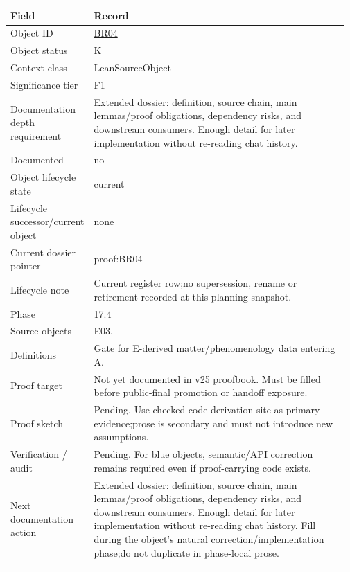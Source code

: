 \begin{longtable}{L{0.16\linewidth} L{0.81\linewidth}}
\hline
\textbf{Field} & \textbf{Record}\\
\hline
Object ID & \hyperlink{object-row-BR04}{BR04}\\
\hline\addlinespace[0.20em]
Object status & K\\
\hline\addlinespace[0.20em]
Context class & LeanSourceObject\\
\hline\addlinespace[0.20em]
Significance tier & F1\\
\hline\addlinespace[0.20em]
Documentation depth requirement & Extended dossier: definition, source chain, main lemmas/\allowbreak{}proof obligations, dependency risks, and downstream consumers. Enough detail for later implementation without re-reading chat history.\\
\hline\addlinespace[0.20em]
Documented & no\\
\hline\addlinespace[0.20em]
Object lifecycle state & current\\
\hline\addlinespace[0.20em]
Lifecycle successor/\allowbreak{}current object & none\\
\hline\addlinespace[0.20em]
Current dossier pointer & proof:BR04\\
\hline\addlinespace[0.20em]
Lifecycle note & Current register row;\newline no supersession, rename or retirement recorded at this planning snapshot.\\
\hline\addlinespace[0.20em]
Phase & \hyperlink{phase-row-17-4}{17.4}\\
\hline\addlinespace[0.20em]
Source objects & E03.\\
\hline\addlinespace[0.20em]
Definitions & Gate for E-derived matter/\allowbreak{}phenomenology data entering A.\\
\hline\addlinespace[0.20em]
Proof target & Not yet documented in v25 proofbook. Must be filled before public-final promotion or handoff exposure.\\
\hline\addlinespace[0.20em]
Proof sketch & Pending. Use checked code derivation site as primary evidence;\newline prose is secondary and must not introduce new assumptions.\\
\hline\addlinespace[0.20em]
Verification /\allowbreak{} audit & Pending. For blue objects, semantic/\allowbreak{}API correction remains required even if proof-carrying code exists.\\
\hline\addlinespace[0.20em]
Next documentation action & Extended dossier: definition, source chain, main lemmas/\allowbreak{}proof obligations, dependency risks, and downstream consumers. Enough detail for later implementation without re-reading chat history. Fill during the object's natural correction/\allowbreak{}implementation phase;\newline do not duplicate in phase-local prose.\\
\hline\addlinespace[0.20em]
\end{longtable}
